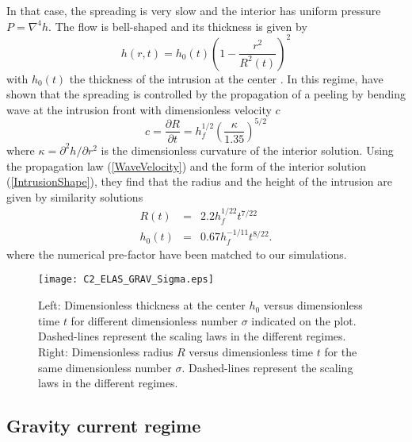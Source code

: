 In that case, the spreading is  very slow and the interior has uniform
pressure $P =\nabla^4h$.  The flow is bell-shaped and its thickness is
given by
\begin{equation}
  h(r,t) = h_0(t)\left(1-\frac{r^2}{R^2(t)}\right)^2
  \label{IntrusionShape}
\end{equation}
with  $h_0(t)$   the  thickness  of   the  intrusion  at   the  center
\citep{Michaut:2011kg,Lister:2013ia}.       In       this      regime,
\citet{Lister:2013ia} have  shown that the spreading  is controlled by
the propagation  of a peeling by  bending wave at the  intrusion front
with dimensionless velocity $c$
\begin{equation}
  c=    \frac{\partial             R}{\partial            t}             =h_f^{1/2}
  \left(\frac{\kappa}{1.35}\right)^{5/2}
  \label{WaveVelocity}
\end{equation}
where  $\kappa  =  \partial^2  h/\partial r^2$  is  the  dimensionless
curvature  of  the  interior  solution.   Using  the  propagation  law
(\ref{WaveVelocity})   and  the   form   of   the  interior   solution
(\ref{IntrusionShape}), they  find that the  radius and the  height of
the intrusion are given by similarity solutions
\begin{eqnarray}
  R(t) &=& 2.2h_f^{1/22}t^{7/22}\label{ScalingR}\\
  h_0(t)&=&0.67 h_f^{-1/11}t^{8/22}\label{ScalingH}.
\end{eqnarray}
where the numerical pre-factor have been matched to our simulations.

  \begin{figure}
    \begin{center}
    \graphicspath{ {/Users/thorey/Documents/These/Manuscript/Figure/Chapter2/} }
      \texttt{[image: C2\_ELAS\_GRAV\_Sigma.eps]}
      \caption{Left:  Dimensionless  thickness  at  the  center  $h_0$
        versus  dimensionless  time  $t$ for  different  dimensionless
        number $\sigma$ indicated on the plot.  Dashed-lines represent the scaling
        laws in the different regimes.  Right: Dimensionless radius $R$ versus
        dimensionless time $t$ for the same dimensionless number $\sigma$.
        Dashed-lines represent the scaling laws in the different regimes.}
      \label{C2_ELAS_GRAV_Sigma}
    \end{center}
  \end{figure}

\subsection{Gravity current regime}
\label{C2-sec:grav-curr-regime}

